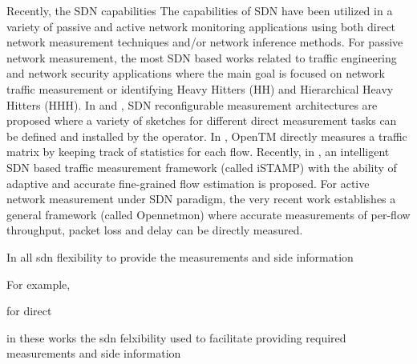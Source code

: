 Recently, the SDN capabilities 
The capabilities of SDN have been utilized in a variety of passive and active network monitoring applications using both direct network measurement techniques and/or network inference methods. For passive network measurement, the most SDN based works related to traffic engineering and network security applications where the main goal is focused on network traffic measurement or identifying Heavy Hitters (HH) and Hierarchical Heavy Hitters (HHH). In \cite{MYu:2011} and \cite{MYu:2013}, SDN reconfigurable measurement architectures are proposed where a variety of sketches for different direct measurement tasks can be defined and installed by the operator. In \cite{Tootoonchian:2010}, OpenTM directly measures a traffic matrix by keeping track of statistics for each flow. Recently, in \cite{IF14iSTAMP:2014}, an intelligent SDN based traffic measurement framework (called iSTAMP) with the ability of adaptive and accurate fine-grained flow estimation is proposed. For active network measurement under SDN paradigm, the very recent work \cite{Adrichen:2014} establishes a general framework (called Opennetmon) where accurate measurements of per-flow throughput, packet loss and delay can be directly measured.

In all 
sdn flexibility to provide the measurements and side information



For example, 

for direct 





in these works the sdn felxibility used to facilitate providing required measurements and side information








